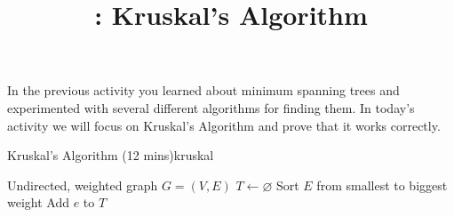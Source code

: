 \documentclass{tufte-handout}
\title{\thecourse: Kruskal's Algorithm}
\date{}
\begin{document}
\maketitle

In the previous activity you learned about minimum spanning trees and
experimented with several different algorithms for finding them.  In
today's activity we will focus on Kruskal's Algorithm and prove that
it works correctly.

\begin{model*}{Kruskal's Algorithm (12 mins)}{kruskal}
  \begin{center}
    
  \end{center}

  \begin{algorithm}[H]
    \begin{algorithmic}[1]
      \Require Undirected, weighted graph $G = (V,E)$
      \State $T \gets \varnothing$   
      \State Sort $E$ from smallest to biggest weight
          \State Add $e$ to $T$
        \EndIf
      \EndFor
    \end{algorithmic}
    \label{alg:kruskal}
  \end{algorithm}
\end{model*}
\end{document}
